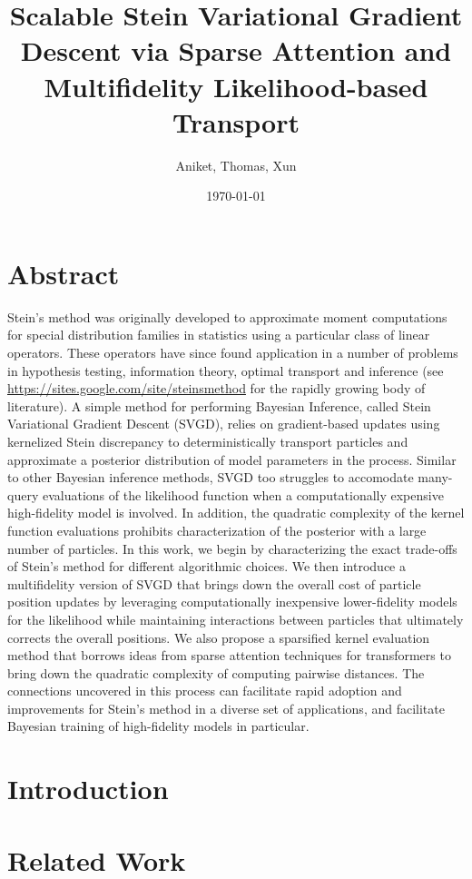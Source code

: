 \documentclass[12pt]{article}
\title{Scalable Stein Variational Gradient Descent via Sparse Attention and Multifidelity Likelihood-based Transport}
\author{Aniket, Thomas, Xun}
\date{\today}
\renewcommand{\[}{\left[}
\renewcommand{\]}{\right]}
\renewcommand{\(}{\left(}
\renewcommand{\)}{\right)}
\begin{document}
\maketitle
\section*{Abstract}
Stein's method was originally developed to approximate moment computations for special distribution families in statistics using a particular class of linear operators.
These operators have since found application in a number of problems in hypothesis testing, information theory, optimal transport and inference (see \url{https://sites.google.com/site/steinsmethod} for the rapidly growing body of literature). 
A simple method for performing Bayesian Inference, called Stein Variational Gradient Descent (SVGD), relies on gradient-based updates using kernelized Stein discrepancy to deterministically transport particles and approximate a posterior distribution of model parameters in the process. 
Similar to other Bayesian inference methods, SVGD too struggles to accomodate many-query evaluations of the likelihood function when a computationally expensive high-fidelity model is involved. In addition, the quadratic complexity of the kernel function evaluations prohibits characterization of the posterior with a large number of particles.
In this work, we begin by characterizing the exact trade-offs of Stein's method for different algorithmic choices. 
We then introduce a multifidelity version of SVGD that brings down the overall cost of particle position updates by leveraging computationally inexpensive lower-fidelity models for the likelihood while maintaining interactions between particles that ultimately corrects the overall positions.
We also propose a sparsified kernel evaluation method that borrows ideas from sparse attention techniques for transformers to bring down the quadratic complexity of computing pairwise distances.
The connections uncovered in this process can facilitate rapid adoption and improvements for Stein's method in a diverse set of applications, and facilitate Bayesian training of high-fidelity models in particular.



\section{Introduction}



\section{Related Work}
\end{document}
